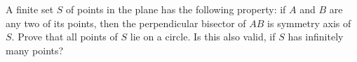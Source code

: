 A finite set $S$ of points in the plane has the following property: if $A$ and $B$ are any two of its points, then the perpendicular bisector of $AB$ is symmetry axis of $S$. Prove that all points of $S$ lie on a circle. Is this also valid, if $S$ has infinitely many points?
